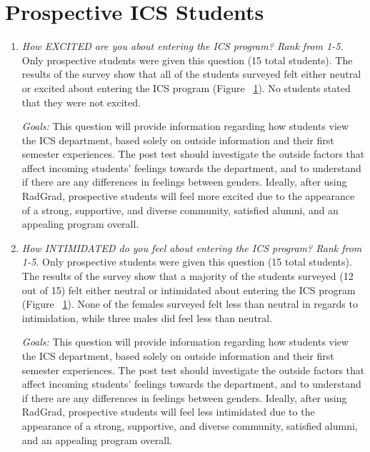 \section{Prospective ICS Students}
\begin{enumerate}
\begin{figure}[h]
\centering
\texttt{[image: sr-excited-intimidated]}
\caption{Results for prospective ICS Students survey}
\label{excited-intimidated}
\end{figure}
\item\textit{How EXCITED are you about entering the ICS program? Rank from 1-5.}
Only prospective students were given this question (15 total students). The results of the survey show that all of the students surveyed felt either neutral or excited about entering the ICS program (Figure ~\ref{excited-intimidated}). No students stated that they were not excited.

\textit{Goals:} This question will provide information regarding how students view the ICS department, based solely on outside information and their first semester experiences. The post test should investigate the outside factors that affect incoming students' feelings towards the department, and to understand if there are any differences in feelings between genders. Ideally, after using RadGrad, prospective students will feel more excited due to the appearance of a strong, supportive, and diverse community, satisfied alumni, and an appealing program overall. 

\item \textit{How INTIMIDATED do you feel about entering the ICS program? Rank from 1-5.}
Only prospective students were given this question (15 total students). The results of the survey show that a majority of the students surveyed (12 out of 15) felt either neutral or intimidated about entering the ICS program (Figure ~\ref{excited-intimidated}). None of the females surveyed felt less than neutral in regards to intimidation, while three males did feel less than neutral. 

\textit{Goals:} This question will provide information regarding how students view the ICS department, based solely on outside information and their first semester experiences. The post test should investigate the outside factors that affect incoming students' feelings towards the department, and to understand if there are any differences in feelings between genders. Ideally, after using RadGrad, prospective students will feel less intimidated due to the appearance of a strong, supportive, and diverse community, satisfied alumni, and an appealing program overall.

\end{enumerate}

